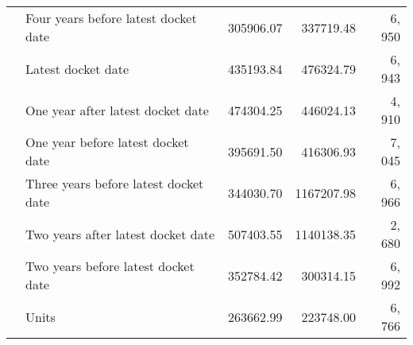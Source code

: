\begin{tabular}{llrrr}
 & Four years before latest docket date & 305906.07 & 337719.48 & 6, 950 \\
 & Latest docket date & 435193.84 & 476324.79 & 6, 943 \\
 & One year after latest docket date & 474304.25 & 446024.13 & 4, 910 \\
 & One year before latest docket date & 395691.50 & 416306.93 & 7, 045 \\
 & Three years before latest docket date & 344030.70 & 1167207.98 & 6, 966 \\
 & Two years after latest docket date & 507403.55 & 1140138.35 & 2, 680 \\
 & Two years before latest docket date & 352784.42 & 300314.15 & 6, 992 \\
 & Units & 263662.99 & 223748.00 & 6, 766 \\
\bottomrule
\end{tabular}

